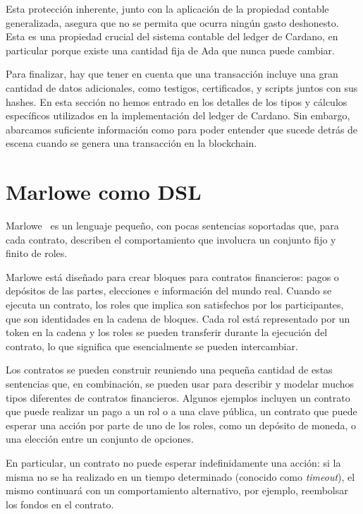 \documentclass[12pt]{book}
\begin{document}
Esta protección inherente, junto con la aplicación de la propiedad contable generalizada, asegura que no se permita que ocurra ningún gasto deshonesto. Esta es una propiedad crucial del sistema contable del ledger de Cardano, en particular porque existe una cantidad fija de Ada que nunca puede cambiar.

Para finalizar, hay que tener en cuenta que una transacción incluye una gran cantidad de datos adicionales, como testigos, certificados, y scripts juntos con sus hashes. En esta sección no hemos entrado en los detalles de los tipos y cálculos específicos utilizados en la implementación del ledger de Cardano. Sin embargo, abarcamos suficiente información como para poder entender que sucede detrás de escena cuando se genera una transacción en la blockchain.


\section{Marlowe como DSL}
Marlowe~\cite{implementing_financial_contracts_on_blockchain, standardized_crypto_loans} es un lenguaje pequeño, con pocas sentencias soportadas que, para cada contrato, describen el comportamiento que involucra un conjunto fijo y finito de roles.

Marlowe está diseñado para crear bloques para contratos financieros: pagos o depósitos de las partes, elecciones e información del mundo real. Cuando se ejecuta un contrato, los roles que implica son satisfechos por los participantes, que son identidades en la cadena de bloques. Cada rol está representado por un token en la cadena y los roles se pueden transferir durante la ejecución del contrato, lo que significa que esencialmente se pueden intercambiar.

Los contratos se pueden construir reuniendo una pequeña cantidad de estas sentencias que, en combinación, se pueden usar para describir y modelar muchos tipos diferentes de contratos financieros. Algunos ejemplos incluyen un contrato que puede realizar un pago a un rol o a una clave pública, un contrato que puede esperar una acción por parte de uno de los roles, como un depósito de moneda, o una elección entre un conjunto de opciones.

En particular, un contrato no puede esperar indefinidamente una acción: si la misma no se ha realizado en un tiempo determinado (conocido como \textit{timeout}), el mismo continuará con un comportamiento alternativo, por ejemplo, reembolsar los fondos en el contrato.
\end{document}
